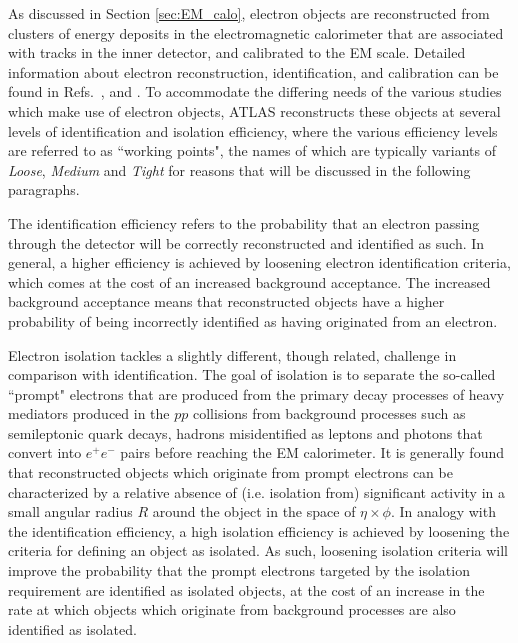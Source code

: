As discussed in Section \ref{sec:EM_calo}, electron objects are reconstructed from clusters of energy deposits in the electromagnetic calorimeter that are associated with tracks in the inner detector, and calibrated to the EM scale. Detailed information about electron reconstruction, identification, and calibration can be found in Refs.~\cite{ATL-PHYS-PUB-2017-022}, \cite{PERF-2017-01} and \cite{PERF-2017-03}. To accommodate the differing needs of the various studies which make use of electron objects, ATLAS reconstructs these objects at several levels of identification and isolation efficiency, where the various efficiency levels are referred to as ``working points", the names of which are typically variants of \emph{Loose}, \emph{Medium} and \emph{Tight} for reasons that will be discussed in the following paragraphs.

The identification efficiency refers to the probability that an electron passing through the detector will be correctly reconstructed and identified as such. In general, a higher efficiency is achieved by loosening electron identification criteria, which comes at the cost of an increased background acceptance. The increased background acceptance means that reconstructed objects have a higher probability of being incorrectly identified as having originated from an electron. 

Electron isolation tackles a slightly different, though related, challenge in comparison with identification. The goal of isolation is to separate the so-called ``prompt" electrons that are produced from the primary decay processes of heavy mediators produced in the \(pp\) collisions from background processes such as semileptonic quark decays, hadrons misidentified as leptons and photons that convert into \(e^+e^-\) pairs before reaching the EM calorimeter. It is generally found that reconstructed objects which originate from prompt electrons can be characterized by a relative absence of (i.e. isolation from) significant activity in a small angular radius \(R\) around the object in the space of \(\eta\times\phi\). In analogy with the identification efficiency, a high isolation efficiency is achieved by loosening the criteria for defining an object as isolated. As such, loosening isolation criteria will improve the probability that the prompt electrons targeted by the isolation requirement are identified as isolated objects, at the cost of an increase in the rate at which objects which originate from background processes are also identified as isolated.
 
